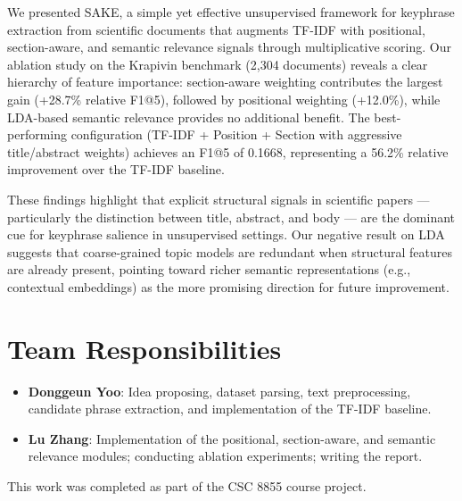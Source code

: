 \documentclass[pdflatex,sn-mathphys-num]{sn-jnl}
\begin{document}
We presented SAKE, a simple yet effective unsupervised framework for keyphrase extraction from
scientific documents that augments TF-IDF with positional, section-aware, and semantic relevance
signals through multiplicative scoring. Our ablation study on the Krapivin benchmark (2,304
documents) reveals a clear hierarchy of feature importance: section-aware weighting contributes the
largest gain (+28.7\% relative F1@5), followed by positional weighting (+12.0\%), while LDA-based
semantic relevance provides no additional benefit. The best-performing configuration (TF-IDF +
Position + Section with aggressive title/abstract weights) achieves an F1@5 of 0.1668, representing
a 56.2\% relative improvement over the TF-IDF baseline.

These findings highlight that explicit structural signals in scientific papers --- particularly the
distinction between title, abstract, and body --- are the dominant cue for keyphrase salience in
unsupervised settings. Our negative result on LDA suggests that coarse-grained topic models are
redundant when structural features are already present, pointing toward richer semantic
representations (e.g., contextual embeddings) as the more promising direction for future improvement.


\section{Team Responsibilities}\label{sec:team}

\begin{itemize}
  \item \textbf{Donggeun Yoo}: Idea proposing, dataset parsing, text preprocessing, candidate
        phrase extraction, and implementation of the TF-IDF baseline.
  \item \textbf{Lu Zhang}: Implementation of the positional, section-aware, and semantic relevance
        modules; conducting ablation experiments; writing the report.
\end{itemize}

\backmatter


This work was completed as part of the CSC 8855 course project.
\end{document}
